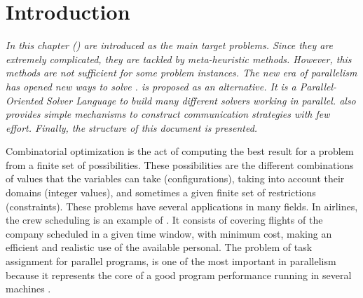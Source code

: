 \chapter{Introduction}
\label{chap:Intro}
\textit{In this chapter \CSPs{} (\csp) are introduced as the main target problems. Since they are extremely complicated, they are tackled by meta-heuristic methods. However, this methods are not sufficient for some problem instances. The new era of parallelism has opened new ways to solve \csps{}. \posl{} is proposed as an alternative. It is a Parallel-Oriented Solver Language to build many different solvers working in parallel. \posl{} also provides simple mechanisms to construct communication strategies with few effort. Finally, the structure of this document is presented.}
\vfill
\minitoc
\newpage

Combinatorial optimization is the act of computing the best result for a problem from a finite set of possibilities. These possibilities are the different combinations of values that the variables can take (configurations), taking into account their domains (integer values), and sometimes a given finite set of restrictions (constraints). These problems have several applications in many fields. In airlines, the crew scheduling is an example of \COP. It consists of covering flights of the company scheduled in a given time window, with minimum cost, making an efficient and realistic use of the available personal. The problem of task assignment for parallel programs, is one of the most important in parallelism because it represents the core of a good program performance running in several machines \cite{Paschos2013}. %

